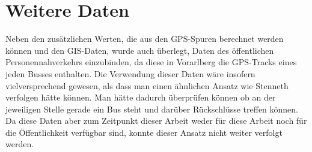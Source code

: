 \section{Weitere Daten}
Neben den zusätzlichen Werten, die aus den GPS-Spuren berechnet werden können und den GIS-Daten, wurde auch überlegt, Daten des öffentlichen Personennahverkehrs einzubinden, da diese in Vorarlberg die GPS-Tracks eines jeden Busses enthalten. Die Verwendung dieser Daten wäre insofern vielversprechend gewesen, als dass man einen ähnlichen Ansatz wie Stenneth verfolgen hätte können. Man hätte dadurch überprüfen können ob an der jeweiligen Stelle gerade ein Bus steht und darüber Rückschlüsse treffen können. Da diese Daten aber zum Zeitpunkt dieser Arbeit weder für diese Arbeit noch für die Öffentlichkeit verfügbar sind, konnte dieser Ansatz nicht weiter verfolgt werden.

\clearpage
